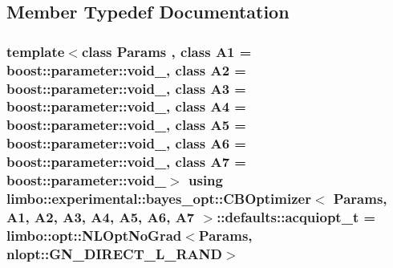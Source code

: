 \subsection{Member Typedef Documentation}
\hypertarget{structlimbo_1_1experimental_1_1bayes__opt_1_1_c_b_optimizer_1_1defaults_a4c7662e52d7a08fab22774eae4cb5822}{}
\subsubsection[{acquiopt\+\_\+t}]{\setlength{\rightskip}{0pt plus 5cm}template$<$class Params , class A1  = boost\+::parameter\+::void\+\_\+, class A2  = boost\+::parameter\+::void\+\_\+, class A3  = boost\+::parameter\+::void\+\_\+, class A4  = boost\+::parameter\+::void\+\_\+, class A5  = boost\+::parameter\+::void\+\_\+, class A6  = boost\+::parameter\+::void\+\_\+, class A7  = boost\+::parameter\+::void\+\_\+$>$ using {\bf limbo\+::experimental\+::bayes\+\_\+opt\+::\+C\+B\+Optimizer}$<$ Params, A1, A2, A3, A4, A5, A6, A7 $>$\+::{\bf defaults\+::acquiopt\+\_\+t} =  {\bf limbo\+::opt\+::\+N\+L\+Opt\+No\+Grad}$<$Params, nlopt\+::\+G\+N\+\_\+\+D\+I\+R\+E\+C\+T\+\_\+\+L\+\_\+\+R\+A\+N\+D$>$}\label{structlimbo_1_1experimental_1_1bayes__opt_1_1_c_b_optimizer_1_1defaults_a4c7662e52d7a08fab22774eae4cb5822}
\hypertarget{structlimbo_1_1experimental_1_1bayes__opt_1_1_c_b_optimizer_1_1defaults_a732a30715b9697aad5c6587cca6acfd3}{}

